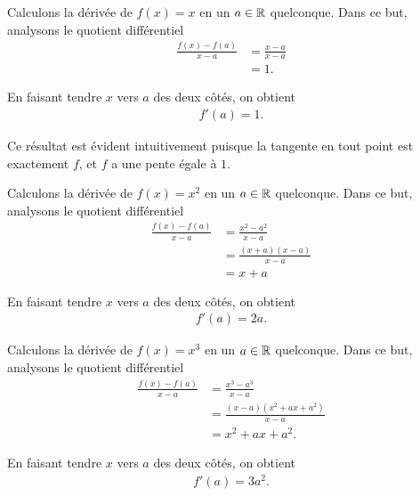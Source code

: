 \documentclass[main.tex]{subfiles}
\begin{document}
\begin{example}
    [Dérivée de $x$]

    Calculons la dérivée de $f(x) = x$ en un $a \in \mathbb{R}$ quelconque.
    Dans ce but,
    analysons le quotient différentiel
    \begin{align}
        \frac {f(x) - f(a)}{x - a}
        &= \frac {x - a}{x - a}\\
        &= 1.
    \end{align}

    En faisant tendre $x$ vers $a$ des deux côtés,
    on obtient
    \begin{align}
        f'(a) = 1.
    \end{align}

    Ce résultat est évident intuitivement
    puisque la tangente en tout point est exactement $f$,
    et $f$ a une pente égale à $1$.
    \begin{plot}{0.25}{-6}{-6}{6}{6}
    \end{plot}
\end{example}

\begin{example}
    [Dérivée de $x^2$]

    Calculons la dérivée de $f(x) = x^2$ en un $a \in \mathbb{R}$ quelconque.
    Dans ce but,
    analysons le quotient différentiel
    \begin{align}
        \frac {f(x) - f(a)}{x - a}
        &= \frac {x^2 - a^2}{x - a}\\
        &= \frac {(x + a)(x - a)}{x - a}\\
        &= x + a
    \end{align}

    En faisant tendre $x$ vers $a$ des deux côtés,
    on obtient
    \begin{align}
        f'(a) = 2a.
    \end{align}
\end{example}

\begin{example}
    [Dérivée de $x^3$]

    Calculons la dérivée de $f(x) = x^3$ en un $a \in \mathbb{R}$ quelconque.
    Dans ce but,
    analysons le quotient différentiel
    \begin{align}
        \frac {f(x) - f(a)}{x - a}
        &= \frac {x^3 - a^3}{x - a}\\
        &= \frac {(x-a)(x^2 + ax + a^2)}{x - a}\\
        &= x^2 + ax + a^2.
    \end{align}

    En faisant tendre $x$ vers $a$ des deux côtés,
    on obtient
    \begin{align}
        f'(a) = 3a^2.
    \end{align}
\end{example}
\end{document}
